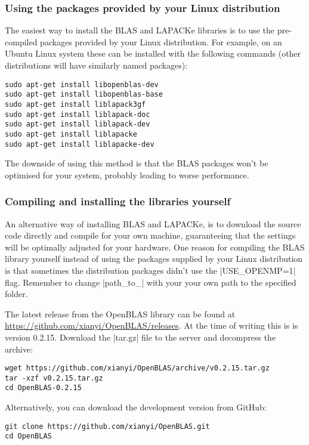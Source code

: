 \documentclass{report}
\begin{document}
\subsubsection{Using the packages provided by your Linux distribution}
The easiest way to install the \ac{BLAS} and LAPACKe libraries is to
use the pre-compiled packages provided by your Linux distribution. For
example, on an Ubuntu Linux system these can be installed with the
following commands (other distributions will have similarly named
packages):
\begin{lstlisting}[escapechar=\%]
sudo apt-get install libopenblas-dev
sudo apt-get install libopenblas-base
sudo apt-get install liblapack3gf
sudo apt-get install liblapack-doc
sudo apt-get install liblapack-dev
sudo apt-get install liblapacke
sudo apt-get install liblapacke-dev
\end{lstlisting}
The downside of using this method is that the BLAS packages won't be
optimised for your system, probably leading to worse performance.


\subsubsection{Compiling and installing the libraries yourself}
An alternative way of installing \ac{BLAS} and LAPACKe, is to download
the source code directly and compile for your own machine,
guaranteeing that the settings will be optimally adjusted for your
hardware. One reason for compiling the \ac{BLAS} library yourself
instead of using the packages supplied by your Linux distribution is
that sometimes the distribution packages didn't use the |USE_OPENMP=1|
flag. Remember to change |path_to_| with your your own path to the
specified folder.

The latest release from the OpenBLAS library can be found at
\url{https://github.com/xianyi/OpenBLAS/releases}. At the time of
writing this is is version 0.2.15. Download the |tar.gz| file to the
server and decompress the archive:
\begin{lstlisting}
wget https://github.com/xianyi/OpenBLAS/archive/v0.2.15.tar.gz
tar -xzf v0.2.15.tar.gz
cd OpenBLAS-0.2.15
\end{lstlisting}

Alternatively, you can download the development version from GitHub:
\begin{lstlisting}[escapechar=\%]
git clone https://github.com/xianyi/OpenBLAS.git
cd OpenBLAS
\end{lstlisting}
\end{document}
